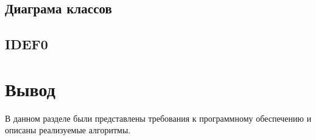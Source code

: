 \subsection{Диаграма классов}

\clearpage
\subsection{IDEF0}

\section*{Вывод}

В данном разделе были представлены требования к программному обеспечению и описаны реализуемые алгоритмы.

